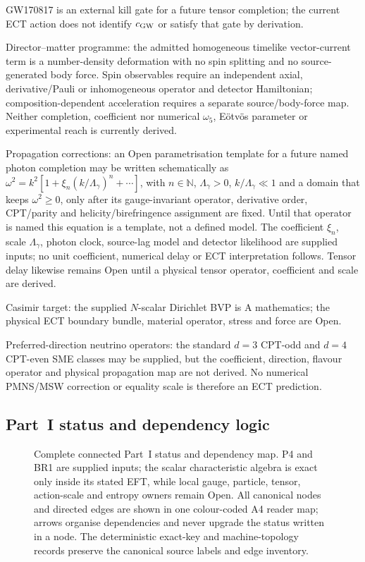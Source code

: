 \documentclass[11pt,a4paper]{article}
\begin{document}
GW170817 is an external kill gate for a future tensor completion; the current ECT action does not identify $c_{\rm GW}$ or satisfy that gate by derivation.

Director--matter programme: the admitted homogeneous timelike
vector-current term is a number-density deformation with no spin splitting and
no source-generated body force.  Spin observables require an independent axial,
derivative/Pauli or inhomogeneous operator and detector Hamiltonian;
composition-dependent acceleration requires a separate source/body-force map.
Neither completion, coefficient nor numerical $\omega_5$, E\"otv\"os parameter
or experimental reach is currently derived.

Propagation corrections: an Open parametrisation template for a future named
photon completion may be written schematically as
$\omega^2=k^2[1+\xi_n(k/\Lambda_\gamma)^n+\cdots]$, with
$n\in\mathbb N$, $\Lambda_\gamma>0$, $k/\Lambda_\gamma\ll1$ and a domain that
keeps $\omega^2\ge0$, only after its gauge-invariant operator, derivative
order, CPT/parity and helicity/birefringence assignment are fixed.  Until that
operator is named this equation is a template, not a defined model.  The
coefficient $\xi_n$, scale $\Lambda_\gamma$, photon clock, source-lag model and
detector likelihood are supplied inputs; no unit coefficient, numerical delay
or ECT interpretation follows.  Tensor delay likewise remains Open until a
physical tensor operator, coefficient and scale are derived.

Casimir target: the supplied $N$-scalar Dirichlet BVP is A mathematics;
the physical ECT boundary bundle, material operator, stress and force are Open.

Preferred-direction neutrino operators: the standard $d=3$ CPT-odd and $d=4$
CPT-even SME classes may be supplied, but the coefficient, direction, flavour
operator and physical propagation map are not derived.  No numerical PMNS/MSW
correction or equality scale is therefore an ECT prediction.

\subsection{Part~I status and dependency logic}

\begin{figure}[H]
\caption{Complete connected Part~I status and dependency map. P4 and BR1 are supplied inputs;
the scalar characteristic algebra is exact only inside its stated EFT, while
local gauge, particle, tensor, action-scale and entropy owners remain Open.
All canonical nodes and directed edges are shown in one colour-coded A4 reader map;
arrows organise dependencies and never upgrade the status written in a node.
The deterministic exact-key and machine-topology records preserve the canonical source labels and edge inventory.}
\label{fig:pop_partI_logic}
\end{figure}
\end{document}
